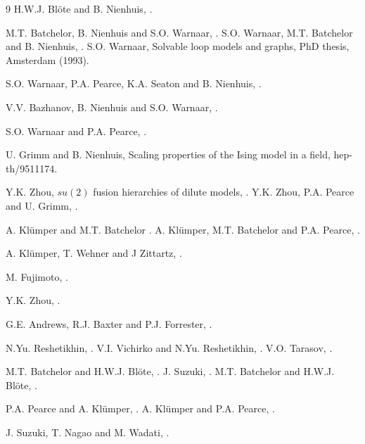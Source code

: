 \begin{thebibliography}{9}
 H.W.J. Bl\"ote and B. Nienhuis, .

 M.T. Batchelor, B. Nienhuis and S.O. Warnaar, 
                 .
 S.O. Warnaar,  M.T. Batchelor and B. Nienhuis,
                 .
 S.O. Warnaar, Solvable loop models and graphs,
          PhD thesis, Amsterdam (1993).

 S.O. Warnaar,  P.A. Pearce, K.A. Seaton and B. Nienhuis,
                  .

 V.V. Bazhanov, B. Nienhuis and S.O. Warnaar,
                 .

 S.O. Warnaar and P.A. Pearce,
                 .

 U. Grimm and B. Nienhuis, Scaling properties of the Ising
  model in a field, hep-th/9511174.

 Y.K. Zhou, $su(2)$ fusion hierarchies of dilute models, 
                .
 Y.K. Zhou, P.A. Pearce and U. Grimm, . 

 A. Kl\"umper and M.T. Batchelor .
 A. Kl\"umper, M.T. Batchelor and P.A. Pearce,
                 .

 A. Kl\"umper, T. Wehner and J Zittartz,
                 .

 M. Fujimoto, .

 Y.K. Zhou, .

 G.E. Andrews, R.J. Baxter and P.J. Forrester, 
.

 N.Yu. Reshetikhin, .
 V.I. Vichirko and N.Yu. Reshetikhin,
                 .
 V.O. Tarasov, .

 M.T. Batchelor and H.W.J. Bl\"ote, .
 J. Suzuki, . 
 M.T. Batchelor and H.W.J. Bl\"ote, .

 P.A. Pearce and A. Kl\"umper, .
 A. Kl\"umper and P.A. Pearce, . 

 J. Suzuki, T. Nagao and M. Wadati, .


\end{thebibliography}
